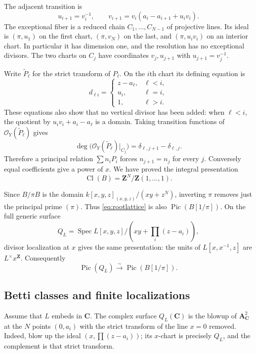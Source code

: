 \documentclass[11pt,a4paper]{article}
\theoremstyle{remark}
\newcommand{\Z}{\mathbf Z}
\newcommand{\C}{\mathbf C}
\newcommand{\A}{\mathbf A}
\newcommand{\OO}{\mathcal O}
\newcommand{\Spec}{\operatorname{Spec}}
\newcommand{\Pic}{\operatorname{Pic}}
\newcommand{\Cl}{\operatorname{Cl}}
\begin{document}
The adjacent transition is
\[
u_{i+1}=v_i^{-1},\qquad
v_{i+1}=v_i(a_i-a_{i+1}+u_i v_i).
\]
The exceptional fiber is a reduced chain $C_1,\ldots,C_{N-1}$ of projective lines. Its ideal is $(\pi,u_1)$ on the first chart, $(\pi,v_N)$ on the last, and $(\pi,u_i v_i)$ on an interior chart. In particular it has dimension one, and the resolution has no exceptional divisors. The two charts on $C_j$ have coordinates $v_j,u_{j+1}$ with $u_{j+1}=v_j^{-1}$.

Write $\widetilde P_\ell$ for the strict transform of $P_\ell$. On the $i$th chart its defining equation is
\[
d_{\ell i}=\begin{cases}
z-a_\ell,&\ell<i,\\
u_i,&\ell=i,\\
1,&\ell>i.
\end{cases}
\]
These equations also show that no vertical divisor has been added: when $\ell<i$, the quotient by $u_i v_i+a_i-a_\ell$ is a domain. Taking transition functions of $\OO_Y(\widetilde P_\ell)$ gives
\[
\deg\bigl(\OO_Y(\widetilde P_\ell)|_{C_j}\bigr)
=\delta_{\ell,j+1}-\delta_{\ell,j}.
\]
Therefore a principal relation $\sum n_iP_i$ forces $n_{j+1}=n_j$ for every $j$. Conversely equal coefficients give a power of $x$. We have proved the integral presentation
\begin{equation}\label{eq:rootlattice}
\Cl(B)=\Z^N/\Z(1,\ldots,1).
\end{equation}

Since $B/\pi B$ is the domain $k[x,y,z]_{(x,y,z)}/(xy+z^N)$, inverting $\pi$ removes just the principal prime $(\pi)$. Thus \eqref{eq:rootlattice} is also $\Pic(B[1/\pi])$. On the full generic surface
\[
Q_L=\Spec L[x,y,z]/\left(xy+\prod_i(z-a_i)\right),
\]
divisor localization at $x$ gives the same presentation: the units of $L[x,x^{-1},z]$ are $L^\times x^{\Z}$. Consequently
\begin{equation}\label{eq:generalpiciso}
\Pic(Q_L)\xrightarrow{\sim}\Pic(B[1/\pi]).
\end{equation}

\subsection{Betti classes and finite localizations}

Assume that $L$ embeds in $\C$. The complex surface $Q_L(\C)$ is the blowup of $\A^2_{\C}$ at the $N$ points $(0,a_i)$ with the strict transform of the line $x=0$ removed. Indeed, blow up the ideal $(x,\prod(z-a_i))$; its $x$-chart is precisely $Q_L$, and the complement is that strict transform.
\end{document}
